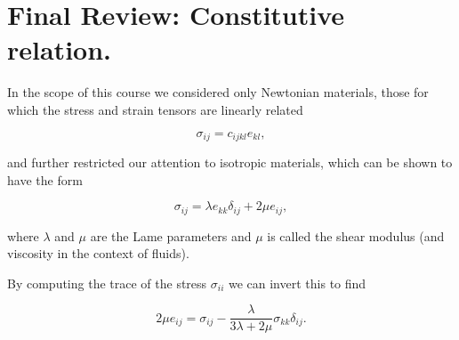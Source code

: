 \section{Final Review: Constitutive relation.}

In the scope of this course we considered only Newtonian materials, those for which the stress and strain tensors are linearly related

\begin{equation}\label{eqn:continuumElasticityReview:290}
\sigma_{ij} = c_{ijkl} e_{kl},
\end{equation}

and further restricted our attention to isotropic materials, which can be shown to have the form

\begin{equation}\label{eqn:continuumElasticityReview:310}
\sigma_{ij} = \lambda e_{kk} \delta_{ij} + 2 \mu e_{ij},
\end{equation}

where $\lambda$ and $\mu$ are the Lame parameters and $\mu$ is called the shear modulus (and viscosity in the context of fluids).

By computing the trace of the stress $\sigma_{ii}$ we can invert this to find

\begin{equation}\label{eqn:continuumElasticityReview:330}
2 \mu e_{ij} = \sigma_{ij} - \frac{\lambda}{3 \lambda + 2 \mu} \sigma_{kk} \delta_{ij}.
\end{equation}


